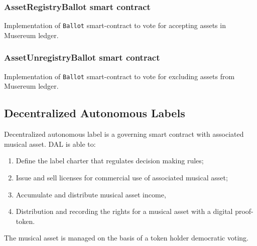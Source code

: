 \documentclass[12pt]{report}
\def\code#1{\colorbox{light-gray}{\texttt{#1}}}
\begin{document}
\subsubsection{AssetRegistryBallot smart contract}
\label{tech-apps-assets-regballot}
Implementation of \code{Ballot} smart-contract to vote for accepting assets in Musereum ledger.

\subsubsection{AssetUnregistryBallot smart contract}
\label{tech-apps-assets-unregballot}
Implementation of \code{Ballot} smart-contract to vote for excluding assets from Musereum ledger.

\subsection{Decentralized Autonomous Labels}
\label{tech-apps-dal}
Decentralized autonomous label is a governing smart contract with associated musical asset. DAL is able to:
\begin{enumerate}
	\item Define the label charter that regulates decision making rules;
	\item Issue and sell licenses for commercial use of associated musical asset;
	\item Accumulate and distribute musical asset income,
	\item Distribution and recording the rights for a musical asset with a digital proof-token.
\end{enumerate}

The musical asset is managed on the basis of a token holder democratic voting.
\end{document}
